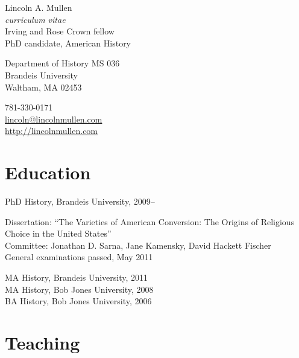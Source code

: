 \documentclass[11pt]{article}
\begin{document}
{\LARGE Lincoln A. Mullen}\\
\emph{curriculum vitae}\\[0.5cm]

Irving and Rose Crown fellow\\
PhD candidate, American History

\begin{multicols}{2}
Department of History MS 036\\
Brandeis University\\
Waltham, MA 02453

\columnbreak

781-330-0171\\
\href{mailto:lincoln@lincolnmullen.com}{lincoln@lincolnmullen.com}\\
\href{http://lincolnmullen.com}{http://lincolnmullen.com}
\end{multicols}


\vskip 0.5cm


\section{Education}
PhD History, Brandeis University, 2009--

\begingroup
{}
Dissertation: ``The Varieties of American Conversion: The Origins of 
Religious Choice in the United States''\\[1pt]
Committee:  Jonathan D. Sarna, Jane Kamensky, David Hackett 
Fischer\\[1pt]
General examinations passed, May 2011
\par
\endgroup

MA History, Brandeis University, 2011\\
MA History, Bob Jones University, 2008\\
BA History, Bob Jones University, 2006




\section{Teaching}
\end{document}
